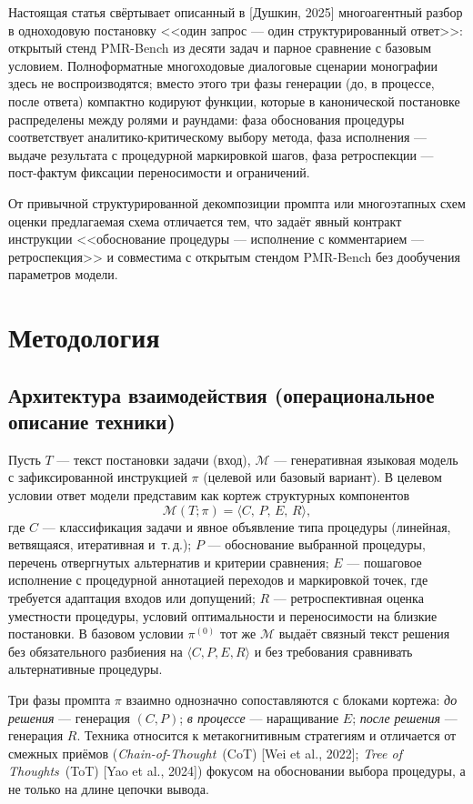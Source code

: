 \documentclass[a4paper,12pt]{article}
\begin{document}
Настоящая статья свёртывает описанный в [Душкин, 2025] многоагентный разбор в одноходовую постановку <<один запрос --- один структурированный ответ>>: открытый стенд PMR-Bench из десяти задач и парное сравнение с базовым условием. Полноформатные многоходовые диалоговые сценарии монографии здесь не воспроизводятся; вместо этого три фазы генерации (до, в процессе, после ответа) компактно кодируют функции, которые в канонической постановке распределены между ролями и раундами: фаза обоснования процедуры соответствует аналитико-критическому выбору метода, фаза исполнения --- выдаче результата с процедурной маркировкой шагов, фаза ретроспекции --- пост-фактум фиксации переносимости и ограничений.

От привычной структурированной декомпозиции промпта или многоэтапных схем оценки предлагаемая схема отличается тем, что задаёт явный контракт инструкции <<обоснование процедуры --- исполнение с комментарием --- ретроспекция>> и совместима с открытым стендом PMR-Bench без дообучения параметров модели.

\section{Методология}

\subsection{Архитектура взаимодействия (операциональное описание техники)}

Пусть $T$ --- текст постановки задачи (вход), $\mathcal{M}$ --- генеративная языковая модель с зафиксированной инструкцией $\pi$ (целевой или базовый вариант). В целевом условии ответ модели представим как кортеж структурных компонентов
\[
\mathcal{M}(T;\pi)=\langle C,\,P,\,E,\,R\rangle,
\]
где $C$ --- классификация задачи и явное объявление типа процедуры (линейная, ветвящаяся, итеративная и~т.\,д.); $P$ --- обоснование выбранной процедуры, перечень отвергнутых альтернатив и критерии сравнения; $E$ --- пошаговое исполнение с процедурной аннотацией переходов и маркировкой точек, где требуется адаптация входов или допущений; $R$ --- ретроспективная оценка уместности процедуры, условий оптимальности и переносимости на близкие постановки. В базовом условии $\pi^{(0)}$ тот же $\mathcal{M}$ выдаёт связный текст решения без обязательного разбиения на $\langle C,P,E,R\rangle$ и без требования сравнивать альтернативные процедуры.

Три фазы промпта $\pi$ взаимно однозначно сопоставляются с блоками кортежа: \textit{до решения} --- генерация $(C,P)$; \textit{в процессе} --- наращивание $E$; \textit{после решения} --- генерация $R$. Техника относится к метакогнитивным стратегиям и отличается от смежных приёмов (\textit{Chain-of-Thought}~(CoT) [Wei et al., 2022]; \textit{Tree of Thoughts}~(ToT) [Yao et al., 2024]) фокусом на обосновании выбора процедуры, а не только на длине цепочки вывода.
\end{document}
